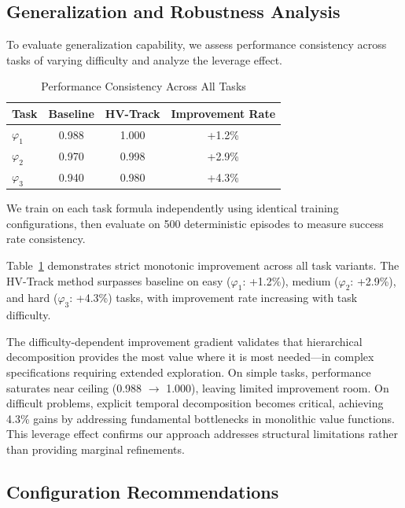 \documentclass{article}
\begin{document}
\subsection{Generalization and Robustness Analysis}
\label{app:generalization}

To evaluate generalization capability, we assess performance consistency across tasks of varying difficulty and analyze the leverage effect.

\begin{table}[h]
\centering
\caption{Performance Consistency Across All Tasks}
\label{tab:performance_consistency}
\begin{tabular}{@{}lccc@{}}
\toprule
\textbf{Task} & \textbf{Baseline} & \textbf{HV-Track} & \textbf{Improvement Rate} \\ \midrule
$\varphi_1$ & 0.988 & 1.000 & +1.2\% \\
$\varphi_2$ & 0.970 & 0.998 & +2.9\% \\
$\varphi_3$ & 0.940 & 0.980 & +4.3\% \\ \bottomrule
\end{tabular}
\end{table}

We train on each task formula independently using identical training configurations, then evaluate on 500 deterministic episodes to measure success rate consistency.

Table~\ref{tab:performance_consistency} demonstrates strict monotonic improvement across all task variants. The HV-Track method surpasses baseline on easy ($\varphi_1$: +1.2\%), medium ($\varphi_2$: +2.9\%), and hard ($\varphi_3$: +4.3\%) tasks, with improvement rate increasing with task difficulty.

The difficulty-dependent improvement gradient validates that hierarchical decomposition provides the most value where it is most needed—in complex specifications requiring extended exploration. On simple tasks, performance saturates near ceiling (0.988 $\rightarrow$ 1.000), leaving limited improvement room. On difficult problems, explicit temporal decomposition becomes critical, achieving 4.3\% gains by addressing fundamental bottlenecks in monolithic value functions. This leverage effect confirms our approach addresses structural limitations rather than providing marginal refinements.

\subsection{Configuration Recommendations}
\end{document}
